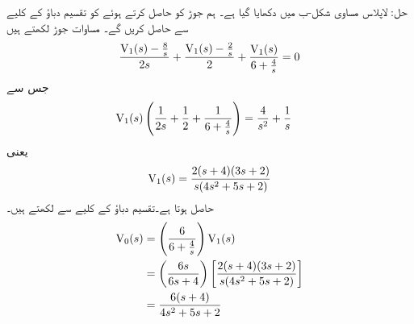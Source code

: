حل: لاپلاس مساوی شکل-ب میں دکھایا گیا ہے۔ ہم جوڑ  کو حاصل کرتے ہوئے  کو تقسیم دباؤ کے کلیے سے حاصل کریں گے۔ مساوات جوڑ لکھتے ہیں
\begin{align*}
\frac{{{\textup{V}}}_1(s)-\frac{8}{s}}{2s}+\frac{{{\textup{V}}}_1(s)-\frac{2}{s}}{2}+\frac{{{\textup{V}}}_1(s)}{6+\frac{4}{s}}=0
\end{align*}
جس سے
\begin{align*}
{\ensuremath{{\textup{V}}}}_1(s)\left(\frac{1}{2s}+\frac{1}{2}+\frac{1}{6+\frac{4}{s}}\right)&=\frac{4}{s^2}+\frac{1}{s}
\end{align*}
یعنی
\begin{align*}
{\ensuremath{{\textup{V}}}}_1(s)=\frac{2(s+4)(3s+2)}{s(4s^2+5s+2)}
\end{align*}
حاصل ہوتا ہے۔تقسیم دباؤ کے کلیے سے  لکھتے ہیں۔
\begin{align*}
{\ensuremath{{\textup{V}}}}_0(s)&=\left(\frac{6}{6+\frac{4}{s}}\right){{\textup{V}}}_1(s)\\
&=\left(\frac{6s}{6s+4}\right)\left[\frac{2(s+4)(3s+2)}{s(4s^2+5s+2)}\right]\\
&=\frac{6(s+4)}{4s^2+5s+2}
\end{align*}

